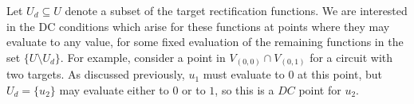 


%

Let $U_d \subseteq U$ denote a subset of the target rectification functions. 
We are interested in the DC conditions which arise for these functions at 
points where they may evaluate to any value, for some fixed 
evaluation of the remaining functions in the set $\{U \setminus U_d\}$. 
For example, consider a point in $V_{(0,0)} \cap V_{(0,1)}$ for 
a circuit with two targets. As discussed previously, $u_1$ must evaluate to $0$ at 
this point, but $U_d = \{u_2\}$ may evaluate either to $0$ or to $1$,
so this is a $DC$ point for $u_2$. 


